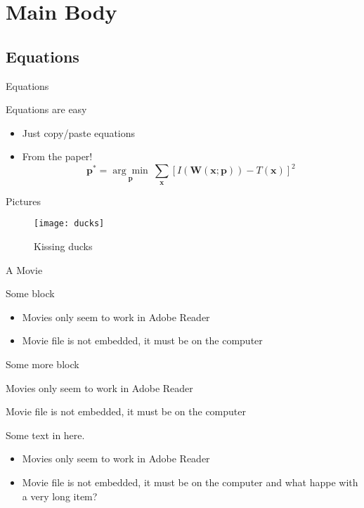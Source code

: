 \section
  {Main Body}

\subsection{Equations}

\begin{frame}
  {Equations}

  Equations are easy
  \begin{itemize}
  \item Just copy/paste equations\pause
  \item From the paper!
    \begin{equation*}
      \textbf{p}^* = \underset{\textbf{p}}{\arg\!\min}~\sum_{\textbf{x}}\left[ I(\textbf{W}(\textbf{x};\textbf{p})) - T(\textbf{x}) \right]^2
    \end{equation*}
  \end{itemize}
\end{frame}


\begin{frame}
  {Pictures}

  \begin{figure}[t]
    \centering
    \texttt{[image: ducks]}
    \caption{Kissing ducks}
  \end{figure}
\end{frame}


\begin{frame}
  {A Movie}

  \begin{block}
    {Some block}

    \begin{itemize}
    \item Movies only seem to work in Adobe Reader
    \item Movie file is not embedded, it must be on the computer
    \end{itemize}
  \end{block}

  \pause
  \begin{alertblock}
    {Some more block}

    Movies only seem to work in Adobe Reader\par
    Movie file is not embedded, it must be on the computer
  \end{alertblock}
  \pause

  \begin{exampleblock}{}
    Some text in here.

    \begin{itemize}[<+->]
    \item Movies only seem to work in Adobe Reader
    \item Movie file is not embedded, it must be on the computer and
      what happe with a very long item?
    \end{itemize}
  \end{exampleblock}
\end{frame}


